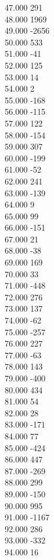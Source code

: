 { 47.000	291 \\
 48.000	1969 \\
 49.000	-2656 \\
 50.000	533 \\
 51.000	-41 \\
 52.000	125 \\
 53.000	14 \\
 54.000	2 \\
 55.000	-168 \\
 56.000	-115 \\
 57.000	122 \\
 58.000	-154 \\
 59.000	307 \\
 60.000	-199 \\
 61.000	-52 \\
 62.000	241 \\
 63.000	-139 \\
 64.000	9 \\
 65.000	99 \\
 66.000	-151 \\
 67.000	21 \\
 68.000	-38 \\
 69.000	169 \\
 70.000	33 \\
 71.000	-448 \\
 72.000	276 \\
 73.000	137 \\
 74.000	-62 \\
 75.000	-257 \\
 76.000	227 \\
 77.000	-63 \\
 78.000	143 \\
 79.000	-400 \\
 80.000	434 \\
 81.000	54 \\
 82.000	28 \\
 83.000	-171 \\
 84.000	77 \\
 85.000	-424 \\
 86.000	447 \\
 87.000	-269 \\
 88.000	299 \\
 89.000	-150 \\
 90.000	995 \\
 91.000	-1167 \\
 92.000	286 \\
 93.000	-332 \\
 94.000	16 \\
}
